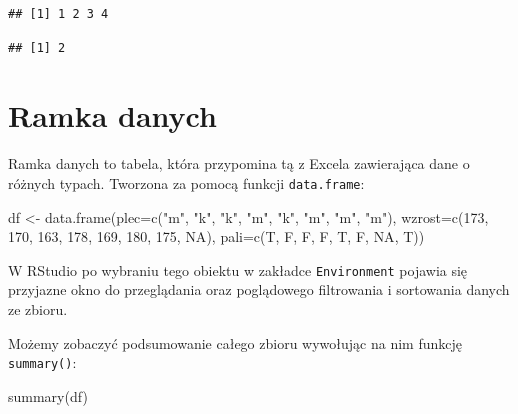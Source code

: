 \documentclass[
]{book}
\newenvironment{Shaded}{\begin{snugshade}}{\end{snugshade}}
\newcommand{\AttributeTok}[1]{\textcolor[rgb]{0.77,0.63,0.00}{#1}}
\newcommand{\ConstantTok}[1]{\textcolor[rgb]{0.00,0.00,0.00}{#1}}
\newcommand{\DecValTok}[1]{\textcolor[rgb]{0.00,0.00,0.81}{#1}}
\newcommand{\FunctionTok}[1]{\textcolor[rgb]{0.00,0.00,0.00}{#1}}
\newcommand{\NormalTok}[1]{#1}
\newcommand{\OtherTok}[1]{\textcolor[rgb]{0.56,0.35,0.01}{#1}}
\newcommand{\SpecialCharTok}[1]{\textcolor[rgb]{0.00,0.00,0.00}{#1}}
\newcommand{\StringTok}[1]{\textcolor[rgb]{0.31,0.60,0.02}{#1}}
\begin{document}
\begin{verbatim}
## [1] 1 2 3 4
\end{verbatim}

\begin{Shaded}
\end{Shaded}

\begin{verbatim}
## [1] 2
\end{verbatim}

\hypertarget{ramka-danych}{%
\section{Ramka danych}\label{ramka-danych}}

Ramka danych to tabela, która przypomina tą z Excela zawierająca dane o różnych typach. Tworzona za pomocą funkcji \texttt{data.frame}:

\begin{Shaded}
\begin{Highlighting}[]
\NormalTok{df }\OtherTok{\textless{}{-}} \FunctionTok{data.frame}\NormalTok{(}\AttributeTok{plec=}\FunctionTok{c}\NormalTok{(}\StringTok{"m"}\NormalTok{, }\StringTok{"k"}\NormalTok{, }\StringTok{"k"}\NormalTok{, }\StringTok{"m"}\NormalTok{, }\StringTok{"k"}\NormalTok{, }\StringTok{"m"}\NormalTok{, }\StringTok{"m"}\NormalTok{, }\StringTok{"m"}\NormalTok{),}
                 \AttributeTok{wzrost=}\FunctionTok{c}\NormalTok{(}\DecValTok{173}\NormalTok{, }\DecValTok{170}\NormalTok{, }\DecValTok{163}\NormalTok{, }\DecValTok{178}\NormalTok{, }\DecValTok{169}\NormalTok{, }\DecValTok{180}\NormalTok{, }\DecValTok{175}\NormalTok{, }\ConstantTok{NA}\NormalTok{),}
                 \AttributeTok{pali=}\FunctionTok{c}\NormalTok{(T, F, F, F, T, F, }\ConstantTok{NA}\NormalTok{, T))}
\end{Highlighting}
\end{Shaded}

W RStudio po wybraniu tego obiektu w zakładce \texttt{Environment} pojawia się przyjazne okno do przeglądania oraz poglądowego filtrowania i sortowania danych ze zbioru.

Możemy zobaczyć podsumowanie całego zbioru wywołując na nim funkcję \texttt{summary()}:

\begin{Shaded}
\begin{Highlighting}[]
\FunctionTok{summary}\NormalTok{(df)}
\end{Highlighting}
\end{Shaded}
\end{document}
